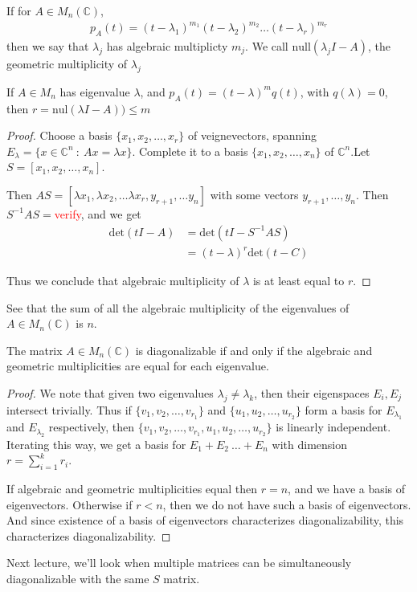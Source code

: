 \begin{definition}
  If for $A \in M_n(\mathbb{C})$,
  \begin{align*}
    p_A(t) = (t - \lambda_1)^{m_1} ( t - \lambda_2)^{m_2} \ldots (t -
    \lambda_r)^{m_r}
  \end{align*}
  then we say that $\lambda_j$ has algebraic multiplicty $m_j$. We
  call $\textrm{null}(\lambda_jI - A)$, the geometric multiplicity of
  $\lambda_j$
\end{definition}

\begin{lemma}
  If $A \in M_n$ has eigenvalue $\lambda$, and $ p_A(t) = (t -
  \lambda)^m q(t)$, with $q(\lambda) = 0$, then $r =
\textrm{nul}(\lambda I - A)) \le m$
\end{lemma}
\begin{proof}
Choose a basis $\{ x_1 , x_2 , \ldots , x_r \}$ of veignevectors,
spanning $E_\lambda = \{ x \in \mathbb{C}^n \ : \ Ax = \lambda x \}$.
Complete it to a basis $\{ x_1 , x_2 , \ldots , x_n \}$ of $
\mathbb{C}^n$.Let $S = [x_1 , x_2 , \ldots , x_n]$.

Then $AS = [ \lambda x_1 , \lambda x_2 , \ldots  \lambda x_r,
y_{r+1}, \ldots y_n]$ with some vectors $y_{r+1} , \ldots , y_n$.
Then $S^{-1}AS = $\textcolor{red}{verify}, and we get
\begin{align*}
  \textrm{det}(tI - A) & = \textrm{det}(tI - S^{-1}AS) \\
  &= ( t - \lambda)^r \textrm{det}(t - C)
\end{align*}

Thus we conclude that algebraic multiplicity of $\lambda$ is at least
equal to $r$.
\end{proof}

\begin{remark}
See that the sum of all the algebraic multiplicity of the eigenvalues
of $A \in M_n(\mathbb{C})$ is $n$.
\end{remark}

\begin{theorem}
The matrix $A \in M_n(\mathbb{C})$ is diagonalizable if and only if
the algebraic and geometric multiplicities are equal for each eigenvalue.
\end{theorem}
\begin{proof}
We note that given two eigenvalues $\lambda_j \neq \lambda_k$, then
their eigenspaces $E_{i}, E_{j}$ intersect trivially. Thus if $\{ v_1
, v_2 , \ldots , v_{r_1} \}$ and $\{ u_1 , u_2 , \ldots , u_{r_2} \}$
form a basis for $E_{\lambda_1}$ and $E_{\lambda_2}$ respectively,
then $\{ v_1 , v_2 , \ldots , v_{r_1}, u_1 , u_2 , \ldots , u_{r_2}
\}$ is linearly independent. Iterating this way, we get a basis for
$E_1 + E_2 \ \ldots  + E_n$ with dimension $r = \sum_{i = 1}^{k} r_i$.

If algebraic and geometric multiplicities equal then $r = n$, and we
have a basis of eigenvectors. Otherwise if $r < n$, then we do not
have such a basis of eigenvectors. And since existence of a basis of
eigenvectors characterizes diagonalizability, this characterizes
diagonalizability.
\end{proof}

Next lecture, we'll look when multiple matrices can be simultaneously
diagonalizable with the same $S$ matrix.
